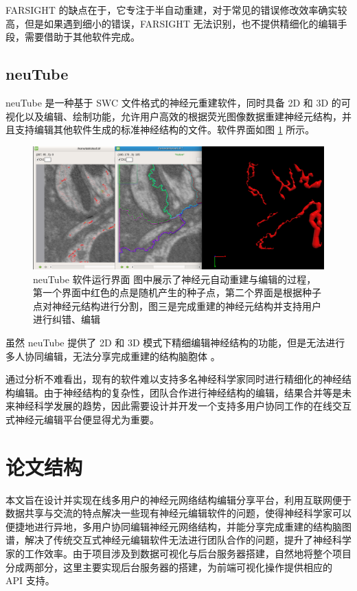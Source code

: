 FARSIGHT 的缺点在于，它专注于半自动重建，对于常见的错误修改效率确实较高，但是如果遇到细小的错误，FARSIGHT 无法识别，也不提供精细化的编辑手段，需要借助于其他软件完成。

\subsection{neuTube}
neuTube 是一种基于 SWC 文件格式的神经元重建软件，同时具备 2D 和 3D 的可视化以及编辑、绘制功能，允许用户高效的根据荧光图像数据重建神经元结构，并且支持编辑其他软件生成的标准神经结构的文件。软件界面如图 \ref{neutube} 所示。

\begin{figure}[!ht]
\centering
\includegraphics[width=148mm]{images/neutube}
\caption{neuTube 软件运行界面 图中展示了神经元自动重建与编辑的过程，第一个界面中红色的点是随机产生的种子点，第二个界面是根据种子点对神经元结构进行分割，图三是完成重建的神经元结构并支持用户进行纠错、编辑}
\label{neutube}
\end{figure}

虽然 neuTube 提供了 2D 和 3D 模式下精细编辑神经结构的功能，但是无法进行多人协同编辑，无法分享完成重建的结构脑胞体 。

通过分析不难看出，现有的软件难以支持多名神经科学家同时进行精细化的神经结构编辑。由于神经结构的复杂性，团队合作进行神经结构的编辑，结果合并等是未来神经科学发展的趋势，因此需要设计并开发一个支持多用户协同工作的在线交互式神经元编辑平台便显得尤为重要。

\section{论文结构}
本文旨在设计并实现在线多用户的神经元网络结构编辑分享平台，利用互联网便于数据共享与交流的特点解决一些现有神经元编辑软件的问题，使得神经科学家可以便捷地进行异地，多用户协同编辑神经元网络结构，并能分享完成重建的结构脑图谱，解决了传统交互式神经元编辑软件无法进行团队合作的问题，提升了神经科学家的工作效率。由于项目涉及到数据可视化与后台服务器搭建，自然地将整个项目分成两部分，这里主要实现后台服务器的搭建，为前端可视化操作提供相应的 API 支持。

